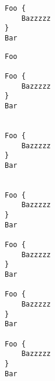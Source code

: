 \documentclass[a4paper, 11pt]{article}
\begin{document}
\blindtext
%
\begin{lstlisting}[caption=foo]
Foo {
    Bazzzzz 
}
Bar
\end{lstlisting}
%
\blindtext
%
\begin{lstlisting}
Foo

Foo {
    Bazzzzz 
}
Bar


Foo {
    Bazzzzz 
}
Bar


Foo {
    Bazzzzz 
}
Bar

Foo {
    Bazzzzz 
}
Bar

Foo {
    Bazzzzz 
}
Bar

Foo {
    Bazzzzz 
}
Bar
\end{lstlisting}

\blindtext

\lstlistoflistings
\end{document}
